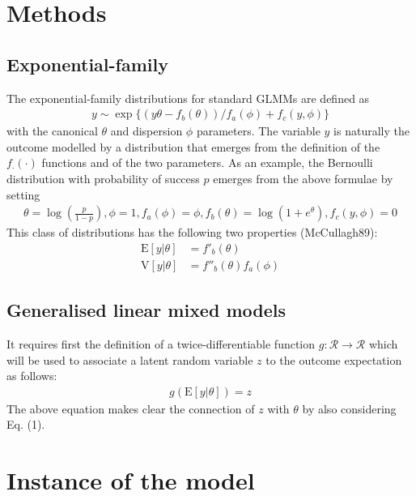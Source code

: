 \section{Methods}

\subsection{Exponential-family}

The exponential-family distributions for standard GLMMs are defined as
\begin{align*}
  y \sim \exp\{(y\theta - f_b(\theta))/f_a(\phi) + f_c(y, \phi)\}
\end{align*}
with the canonical $\theta$ and dispersion $\phi$ parameters.
The variable $y$ is naturally the outcome modelled by a distribution that
emerges from the definition of the $f_{\cdot}(\cdot)$ functions and of the two
parameters. As an example, the Bernoulli distribution with probability of
success $p$ emerges from the above formulae by setting
\begin{align*}
  \theta = \log\left(\frac{p}{1-p}\right), \phi = 1, f_a(\phi) = \phi,
	f_b(\theta)=\log(1+e^\theta), f_c(y, \phi) = 0
\end{align*}
This class of distributions has the following two properties (McCullagh89):
\begin{align*}
  \mathrm E[y|\theta] &= f'_b(\theta)\\
  \mathrm V[y|\theta] &= f''_b(\theta) f_a(\phi)
\end{align*}

\subsection{Generalised linear mixed models}

It requires first the definition of a twice-differentiable function
$g:\mathcal R \rightarrow \mathcal R$ which will be used to associate a latent
random variable $z$ to the outcome expectation as follows:
\begin{align*}
  g(\mathrm E[y|\theta]) = z
\end{align*}
The above equation makes clear the connection of $z$ with $\theta$ by also
considering Eq. (1).

\section{Instance of the model}

